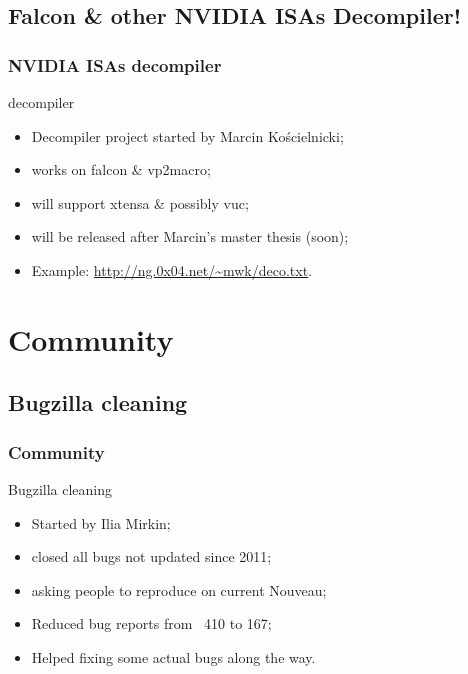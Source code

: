 \documentclass[11pt,english,compress]{beamer}
\begin{document}
\subsection{Falcon \& other NVIDIA ISAs Decompiler!}
\begin{frame}
	\frametitle{NVIDIA ISAs decompiler}

	\begin{block}{decompiler}
		\begin{itemize}
			\item Decompiler project started by Marcin Kościelnicki;
			\item works on falcon \& vp2macro;
			\item will support xtensa \& possibly vuc;
			\item will be released after Marcin's master thesis (soon);
			\item Example: \url{http://ng.0x04.net/~mwk/deco.txt}.
		\end{itemize}
	\end{block}
\end{frame}

\section{Community}

\subsection{Bugzilla cleaning}
\begin{frame}
	\frametitle{Community}

	\begin{block}{Bugzilla cleaning}
		\begin{itemize}
			\item Started by Ilia Mirkin;
			\item closed all bugs not updated since 2011;
			\item asking people to reproduce on current Nouveau;
			\item Reduced bug reports from ~410 to 167;
			\item Helped fixing some actual bugs along the way.
		\end{itemize}
	\end{block}
\end{frame}
\end{document}
